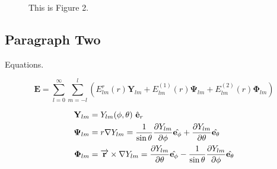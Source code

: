 \documentclass[11pt, a4paper]{article}
\numberwithin{equation}{section} %
\begin{document}
		\begin{figure}[ht]
			\centering
			\hspace{0in}
			\caption{This is Figure 2.}
		\end{figure}

	\subsection{Paragraph Two}

		Equations.

		\begin{equation}
			\mathbf{E}=\sum_{l=0}^{\infty} \sum_{m=-l}^{l}\left(E_{l m}^{r}(r) \mathbf{Y}_{l m}+E_{l m}^{(1)}(r) \mathbf{\Psi}_{l m}+E_{l m}^{(2)}(r) \mathbf{\Phi}_{l m}\right)
		\end{equation}

		\begin{align}
			\mathbf{Y}_{l m}    & =Y_{l m}(\phi,\theta)\  \hat{\mathbf{e}}_r \\
			\notag
		    \mathbf{\Psi}_{l m} & =r \nabla Y_{l m}=\frac{1}{\sin \theta} \frac{\partial Y_{lm}}{\partial \phi}\hat{\mathbf{e}_{\phi}} + \frac{\partial Y_{lm}}{\partial \theta}\hat{\mathbf{e}_{\theta}} \\
		    \mathbf{\Phi}_{l m} & =\overrightarrow{\mathbf{r}} \times \nabla Y_{l m}=\frac{\partial Y_{lm}}{\partial \theta}\hat{\mathbf{e}_{\phi}} -\frac{1}{\sin \theta} \frac{\partial Y_{lm}}{\partial \phi}\hat{\mathbf{e}_{\theta}}
		\end{align}
\end{document}
